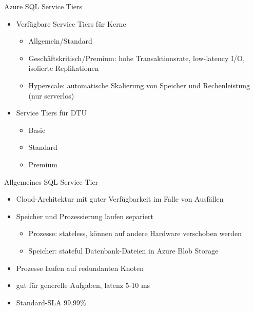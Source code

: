
\begin{flashcard}[Definition]{Azure SQL Service Tiers}
  \begin{itemize}
    \item Verfügbare Service Tiers für Kerne
      \begin{itemize}
        \item Allgemein/Standard
        \item Geschäftskritisch/Premium: hohe Transaktionsrate, low-latency I/O,
          \newline isolierte Replikationen
        \item Hyperscale: automatische Skalierung von Speicher und Rechenleistung\newline
          (nur serverlos)
      \end{itemize}
    \item Service Tiers für DTU
      \begin{itemize}
        \item Basic
        \item Standard
        \item Premium
      \end{itemize}
  \end{itemize}
\end{flashcard}

\begin{flashcard}[Definition]{Allgemeines SQL Service Tier}
  \begin{itemize}
    \item Cloud-Architektur mit guter Verfügbarkeit im Falle von Ausfällen
    \item Speicher und Prozessierung laufen separiert
      \begin{itemize}
        \item Prozesse: stateless, können auf andere Hardware verschoben werden
        \item Speicher: stateful Datenbank-Dateien in Azure Blob Storage
      \end{itemize}
    \item Prozesse laufen auf redundanten Knoten
    \item gut für generelle Aufgaben, latenz 5-10 ms
    \item Standard-SLA 99,99\%
  \end{itemize}
\end{flashcard}

